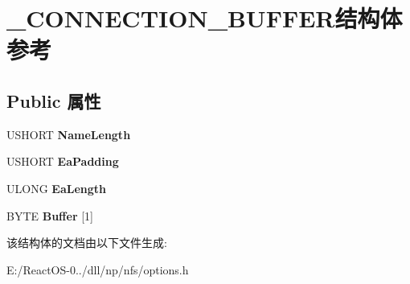 \hypertarget{struct___c_o_n_n_e_c_t_i_o_n___b_u_f_f_e_r}{}\section{\+\_\+\+C\+O\+N\+N\+E\+C\+T\+I\+O\+N\+\_\+\+B\+U\+F\+F\+E\+R结构体 参考}
\label{struct___c_o_n_n_e_c_t_i_o_n___b_u_f_f_e_r}
\subsection*{Public 属性}
\begin{DoxyCompactItemize}
\item 
\mbox{\label{struct___c_o_n_n_e_c_t_i_o_n___b_u_f_f_e_r_a105082cf5e0febd9bc220fd01f1db9c4}} 
U\+S\+H\+O\+RT {\bfseries Name\+Length}
\item 
\mbox{\label{struct___c_o_n_n_e_c_t_i_o_n___b_u_f_f_e_r_ad19a8d12fa4b8ab5511a2059ef0237c9}} 
U\+S\+H\+O\+RT {\bfseries Ea\+Padding}
\item 
\mbox{\label{struct___c_o_n_n_e_c_t_i_o_n___b_u_f_f_e_r_ae79aae8667f219502a55cf050704e713}} 
U\+L\+O\+NG {\bfseries Ea\+Length}
\item 
\mbox{\label{struct___c_o_n_n_e_c_t_i_o_n___b_u_f_f_e_r_ad870ac44e9ccb56445b763c98ca29d8d}} 
B\+Y\+TE {\bfseries Buffer} \mbox{[}1\mbox{]}
\end{DoxyCompactItemize}


该结构体的文档由以下文件生成\+:\begin{DoxyCompactItemize}
\item 
E\+:/\+React\+O\+S-\/0../dll/np/nfs/options.\+h\end{DoxyCompactItemize}
